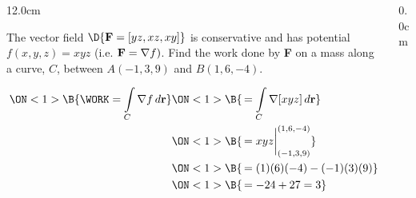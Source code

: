 \begin{frame}
\begin{columns}\begin{column}{12.0cm}

\vspace{0.1cm}

\scriptsize

\EX The vector field $\D{{\bf F} = [yz,xz,xy]}$ is conservative and has potential $f(x,y,z) = xyz$ (i.e. ${\bf F} = \nabla f)$.  Find the work done by {\bf F} on a mass along a curve, $C$, between $A(-1,3,9)$ and $B(1,6,-4)$. 

\vspace{0.2cm}

\SOL {}

\vspace{0.2cm}

\begin{align*}
	\ON<1>{\B{\WORK 
	    = \int \limits_{C} \nabla f \, d{\bf r} }}
	&\ON<1>{\B{\, = \int \limits_{C} \nabla[xyz] \, d{\bf r}}} \\
	&\ON<1>{\B{\, = xyz\biggr|_{(-1,3,9)}^{(1,6,-4)}}} \\
	&\ON<1>{\B{\, = (1)(6)(-4) - (-1)(3)(9)}} \\
	&\ON<1>{\B{\, = -24 + 27 = 3}}\\
\end{align*}

\vspace{3.2cm}

\end{column}\begin{column}{0.0cm}\end{column}\end{columns}
\end{frame}

